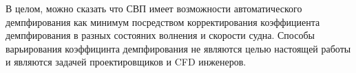 В целом, можно сказать что СВП имеет возможности автоматического демпфирования как минимум посредством корректирования коэффициента демпфирования в разных состояних волнения и скорости судна. Способы варьирования коэффицинта демпфирования не являются целью настоящей работы и являются задачей проектировщиков и CFD инженеров.